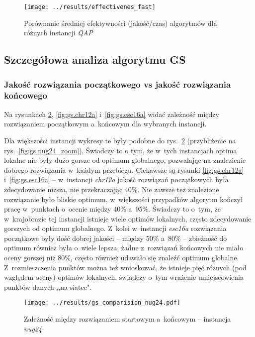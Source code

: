 \documentclass{article}
\begin{document}
			\begin{figure}[h]
				\texttt{[image: ../results/effectivenes\_fast]}
				\caption{Porównanie średniej efektywności (jakość/czas) algorytmów dla różnych instancji \emph{QAP}\label{fig:effectivenes_fast}}
			\end{figure}


	\subsection{Szczegółowa analiza algorytmu GS}

		\subsubsection{Jakość rozwiązania początkowego vs jakość rozwiązania końcowego}
			Na rysunkach \ref{fig:gs.nug24}, \ref{fig:gs.chr12a} i~\ref{fig:gs.esc16a} widać zależność między rozwiązaniem początkowym a~końcowym dla wybranych instancji.
			
			Dla większości instancji wykresy te były podobne do rys.~\ref{fig:gs.nug24} (przybliżenie na rys.~\ref{fig:gs.nug24_zoom}). Świadczy to o tym, że w~tych instancjach optima lokalne nie były dużo gorsze od optimum globalnego, pozwalając na znalezienie dobrego rozwiązania w~każdym przebiegu. Ciekawsze są rysunki \ref{fig:gs.chr12a} i~\ref{fig:gs.esc16a} -- w~instancji \emph{chr12a} jakość rozwiązań początkowych była zdecydowanie niższa, nie przekraczając 40\%. Nie zawsze też znalezione rozwiązanie było bliskie optimum, w~większości przypadków algorytm kończył pracę w~punktach o~ocenie między 40\% a~95\%. Świadczy to o~tym, że w~krajobrazie tej instancji istnieje wiele optimów lokalnych, często zdecydowanie gorszych od optimum globalnego. Z~kolei w~instancji \emph{esc16a} rozwiązania początkowe były dość dobrej jakości -- między 50\% a~80\% -- zbieżność do optimum również była o~wiele lepsza, żadne z~rozwiązań końcowych nie miało oceny gorszej niż 80\%, często również udawało się znaleźć optimum globalne. Z~rozmieszczenia punktów można też wnioskować, że istnieje pięć różnych (pod względem oceny) optimów lokalnych, świadczy o~tym wrażenie umiejscowienia punktów danych ,,na siatce".
			
			\begin{figure}[h]
				\texttt{[image: ../results/gs\_comparision\_nug24.pdf]}
				\caption{Zależność między rozwiązaniem startowym a~końcowym -- instancja \emph{nug24}\label{fig:gs.nug24}}				
			\end{figure}
			
\end{document}
